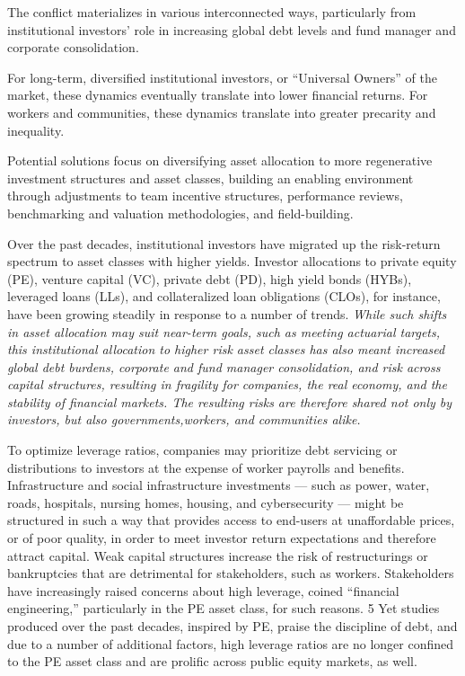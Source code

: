 \documentclass[
]{book}
\begin{document}
The conflict materializes in various interconnected ways, particularly from
institutional investors' role in increasing global debt levels and
fund manager and corporate consolidation.

For long-term, diversified institutional investors, or ``Universal Owners''
of the market, these dynamics eventually translate into lower financial returns.
For workers and communities, these dynamics translate into
greater precarity and inequality.

Potential solutions focus on diversifying asset allocation to
more regenerative investment structures and asset classes, building an
enabling environment through adjustments to team incentive structures, performance reviews,
benchmarking and valuation methodologies, and field-building.

Over the past decades, institutional investors have migrated up
the risk-return spectrum to asset classes with higher yields.
Investor allocations to private equity (PE), venture capital (VC), private debt (PD),
high yield bonds (HYBs), leveraged loans (LLs), and
collateralized loan obligations (CLOs), for instance,
have been growing steadily in response to a number of trends.
\emph{While such shifts in asset allocation may suit near-term goals,
such as meeting actuarial targets, this institutional allocation to higher risk asset
classes has also meant increased global debt burdens, corporate and
fund manager consolidation, and risk across capital structures,
resulting in fragility for companies, the real economy, and the stability of
financial markets.
The resulting risks are therefore shared not only by investors,
but also governments,workers, and communities alike.}

To optimize leverage ratios, companies may prioritize debt servicing or distributions to investors at the
expense of worker payrolls and benefits. Infrastructure and social infrastructure investments --- such as
power, water, roads, hospitals, nursing homes, housing, and cybersecurity --- might be structured in
such a way that provides access to end-users at unaffordable prices, or of poor quality, in order to meet
investor return expectations and therefore attract capital. Weak capital structures increase the risk of
restructurings or bankruptcies that are detrimental for stakeholders, such as workers. Stakeholders have
increasingly raised concerns about high leverage, coined ``financial engineering,'' particularly in the PE
asset class, for such reasons. 5 Yet studies produced over the past decades, inspired by PE, praise the
discipline of debt, and due to a number of additional factors, high leverage ratios are no longer confined
to the PE asset class and are prolific across public equity markets, as well.
\end{document}
